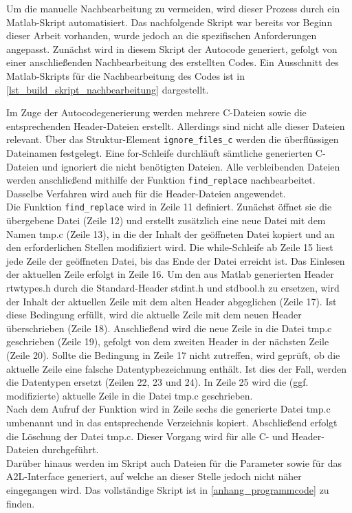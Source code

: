 Um die manuelle Nachbearbeitung zu vermeiden, wird dieser Prozess durch ein Matlab-Skript automatisiert. Das nachfolgende Skript war bereits vor Beginn dieser Arbeit vorhanden, wurde jedoch an die spezifischen Anforderungen angepasst. Zunächst wird in diesem Skript der Autocode generiert, gefolgt von einer anschließenden Nachbearbeitung des erstellten Codes. Ein Ausschnitt des Matlab-Skripts für die Nachbearbeitung des Codes ist in \autoref{lst_build_skript_nachbearbeitung} dargestellt.
 
Im Zuge der Autocodegenerierung werden mehrere C-Dateien sowie die entsprechenden Header-Dateien erstellt. Allerdings sind nicht alle dieser Dateien relevant. Über das Struktur-Element \lstinline{ignore_files_c} werden die überflüssigen Dateinamen festgelegt. Eine for-Schleife durchläuft sämtliche generierten C-Dateien und ignoriert die nicht benötigten Dateien. Alle verbleibenden Dateien werden anschließend mithilfe der Funktion \lstinline{find_replace} nachbearbeitet. Dasselbe Verfahren wird auch für die Header-Dateien angewendet.\\
Die Funktion \lstinline{find_replace} wird in Zeile 11 definiert. Zunächst öffnet sie die übergebene Datei (Zeile 12) und erstellt zusätzlich eine neue Datei mit dem Namen tmp.c (Zeile 13), in die der Inhalt der geöffneten Datei kopiert und an den erforderlichen Stellen modifiziert wird. Die while-Schleife ab Zeile 15 liest jede Zeile der geöffneten Datei, bis das Ende der Datei erreicht ist. Das Einlesen der aktuellen Zeile erfolgt in Zeile 16. Um den aus Matlab generierten Header rtwtypes.h durch die Standard-Header stdint.h und stdbool.h zu ersetzen, wird der Inhalt der aktuellen Zeile mit dem alten Header abgeglichen (Zeile 17). Ist diese Bedingung erfüllt, wird die aktuelle Zeile mit dem neuen Header überschrieben (Zeile 18). Anschließend wird die neue Zeile in die Datei tmp.c geschrieben (Zeile 19), gefolgt von dem zweiten Header in der nächsten Zeile (Zeile 20). Sollte die Bedingung in Zeile 17 nicht zutreffen, wird geprüft, ob die aktuelle Zeile eine \glqq falsche\grqq{} Datentypbezeichnung enthält. Ist dies der Fall, werden die Datentypen ersetzt (Zeilen 22, 23 und 24). In Zeile 25 wird die (ggf. modifizierte) aktuelle Zeile in die Datei tmp.c geschrieben. \\
Nach dem Aufruf der Funktion wird in Zeile sechs die generierte Datei tmp.c umbenannt und in das entsprechende Verzeichnis kopiert. Abschließend erfolgt die Löschung der Datei tmp.c. Dieser Vorgang wird für alle C- und Header-Dateien durchgeführt. \\
Darüber hinaus werden im Skript auch Dateien für die Parameter sowie für das A2L-Interface generiert, auf welche an dieser Stelle jedoch nicht näher eingegangen wird. Das vollständige Skript ist in \autoref{anhang_programmcode} zu finden.
